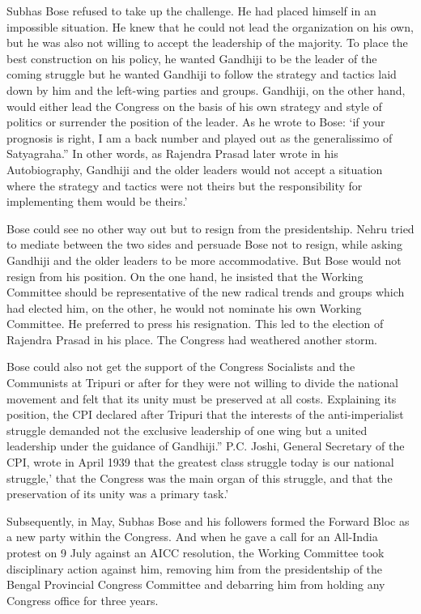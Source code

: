 Subhas Bose refused to take up the challenge. He had placed himself in an impossible situation. He knew that he could not lead the organization on his own, but he was also not willing to accept the leadership of the majority. To place the best construction on his policy, he wanted Gandhiji to be the leader of the coming struggle but he wanted Gandhiji to follow the strategy and tactics laid down by him and the left-wing parties and groups. Gandhiji, on the other hand, would either lead the Congress on the basis of his own strategy and style of politics or surrender the position of the leader. As he wrote to Bose: ‘if your prognosis is right, I am a back number and played out as the generalissimo of Satyagraha.” In other words, as Rajendra Prasad later wrote in his Autobiography, Gandhiji and the older leaders would not accept a situation where the strategy and tactics were not theirs but the responsibility for implementing them would be theirs.’ 

Bose could see no other way out but to resign from the presidentship. Nehru tried to mediate between the two sides and persuade Bose not to resign, while asking Gandhiji and the older leaders to be more accommodative. But Bose would not resign from his position. On the one hand, he insisted that the Working Committee should be representative of the new radical trends and groups which had elected him, on the other, he would not nominate his own Working Committee. He preferred to press his resignation. This led to the election of Rajendra Prasad in his place. The Congress had weathered another storm. 

Bose could also not get the support of the Congress Socialists and the Communists at Tripuri or after for they were not willing to divide the national movement and felt that its unity must be preserved at all costs. Explaining its position, the CPI declared after Tripuri that the interests of the anti-imperialist struggle demanded not the exclusive leadership of one wing but a united leadership under the guidance of Gandhiji.” P.C. Joshi, General Secretary of the CPI, wrote in April 1939 that the greatest class struggle today is our national struggle,’ that the Congress was the main organ of this struggle, and that the preservation of its unity was a primary task.’ 

Subsequently, in May, Subhas Bose and his followers formed the Forward Bloc as a new party within the Congress. And when he gave a call for an All-India protest on 9 July against an AICC resolution, the Working Committee took disciplinary action against him, removing him from the presidentship of the Bengal Provincial Congress Committee and debarring him from holding any Congress office for three years. 

